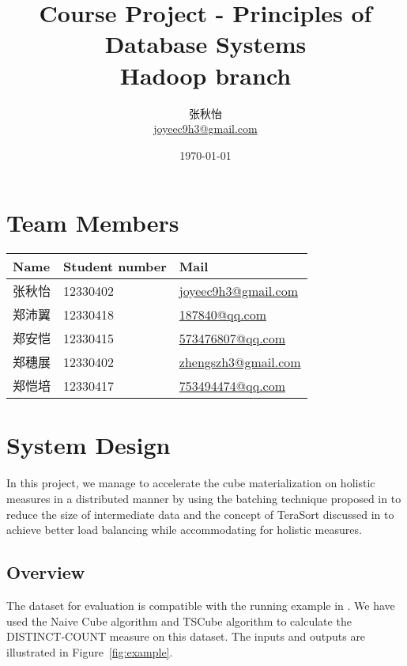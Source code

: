 \documentclass{article}
\begin{document}


\title{Course Project - Principles of Database Systems \\ Hadoop branch}
\author{张秋怡 \\ \href{mailto:joyeec9h3@gmail.com}{joyeec9h3@gmail.com}} 
\date{\today}
\maketitle

\tableofcontents
\section{Team Members}

\begin{table}[H]
\centering
\begin{tabular}{l l l}
Name              & Student number & Mail \\
\hline
张秋怡 & 12330402 &  \href{mailto:joyeec9h3@gmail.com}{joyeec9h3@gmail.com}  \\
郑沛翼 & 12330418 &  \href{mailto:187840@qq.com}{187840@qq.com}  \\
郑安恺 & 12330415 &  \href{mailto:573476807@qq.com}{573476807@qq.com}  \\
郑穗展 & 12330402 &  \href{mailto:zhengszh3@gmail.com}{zhengszh3@gmail.com}  \\
郑恺培 & 12330417 &  \href{mailto:753494474@qq.com}{753494474@qq.com}
\end{tabular}
\end{table}

\section{System Design}

In this project, we manage to accelerate the cube materialization on holistic measures in a distributed manner by using the batching technique proposed in \cite{nandi2012data} to reduce the size of intermediate data and the concept of TeraSort discussed in \cite{tao2013minimal} to achieve better load balancing while accommodating for holistic measures.

\subsection{Overview}

The dataset for evaluation is compatible with the running example in \cite{nandi2012data}. We have used the Naive Cube algorithm and TSCube algorithm to calculate the DISTINCT-COUNT measure on this dataset. The inputs and outputs are illustrated in Figure~\ref{fig:example}.
\end{document}
